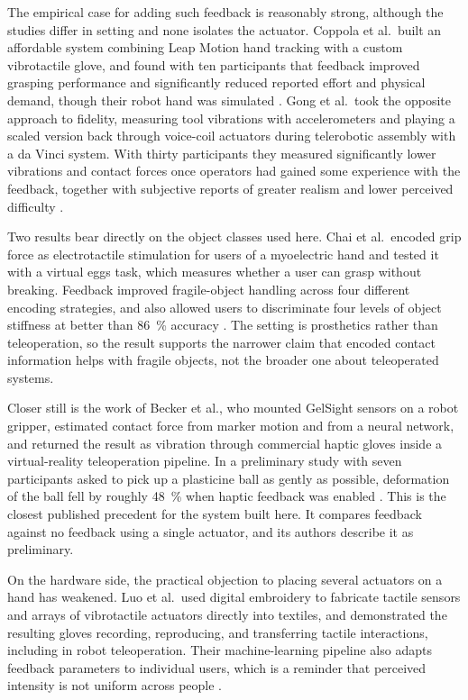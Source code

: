 \documentclass[12pt, a4paper, twoside, openright]{report}
\begin{document}
The empirical case for adding such feedback is reasonably strong, although the
studies differ in setting and none isolates the actuator. Coppola et al.\ built
an affordable system combining Leap Motion hand tracking with a custom
vibrotactile glove, and found with ten participants that feedback improved
grasping performance and significantly reduced reported effort and physical
demand, though their robot hand was simulated \cite{coppola2022}. Gong et al.\
took the opposite approach to fidelity, measuring tool vibrations with
accelerometers and playing a scaled version back through voice-coil actuators
during telerobotic assembly with a da Vinci system. With thirty participants
they measured significantly lower vibrations and contact forces once operators
had gained some experience with the feedback, together with subjective reports
of greater realism and lower perceived difficulty \cite{gong2024}.

Two results bear directly on the object classes used here. Chai et al.\ encoded
grip force as electrotactile stimulation for users of a myoelectric hand and
tested it with a virtual eggs task, which measures whether a user can grasp
without breaking. Feedback improved fragile-object handling across four
different encoding strategies, and also allowed users to discriminate four
levels of object stiffness at better than \SI{86}{\percent} accuracy
\cite{chai2022}. The setting is prosthetics rather than teleoperation, so the
result supports the narrower claim that encoded contact information helps with
fragile objects, not the broader one about teleoperated systems.

Closer still is the work of Becker et al., who mounted GelSight sensors on a
robot gripper, estimated contact force from marker motion and from a neural
network, and returned the result as vibration through commercial haptic gloves
inside a virtual-reality teleoperation pipeline. In a preliminary study with
seven participants asked to pick up a plasticine ball as gently as possible,
deformation of the ball fell by roughly \SI{48}{\percent} when haptic feedback
was enabled \cite{becker2024}. This is the closest published precedent for the
system built here. It compares feedback against no feedback using a single
actuator, and its authors describe it as preliminary.

On the hardware side, the practical objection to placing several actuators on
a hand has weakened. Luo et al.\ used digital embroidery to fabricate tactile
sensors and arrays of vibrotactile actuators directly into textiles, and
demonstrated the resulting gloves recording, reproducing, and transferring
tactile interactions, including in robot teleoperation. Their machine-learning
pipeline also adapts feedback parameters to individual users, which is a
reminder that perceived intensity is not uniform across people \cite{luo2024}.
\end{document}
